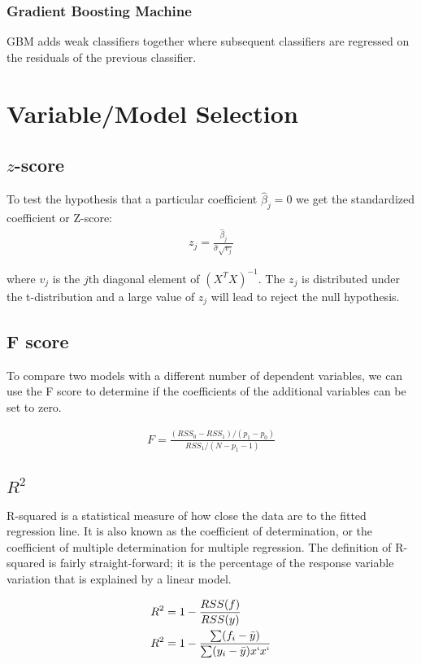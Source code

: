 \documentclass[12pt]{article}
\begin{document}
\subsubsection{Gradient Boosting Machine}
GBM adds weak classifiers together where subsequent classifiers are regressed on the residuals of the previous classifier.

\section{Variable/Model Selection}

\subsection{$z$-score}
To test the hypothesis that a particular coefficient $\hat{\beta}_j = 0$ we get the standardized coefficient or Z-score:
\begin{align*}
z_j = \frac{\hat{\beta}_j}{\hat{\sigma}\sqrt{v_j}}
\end{align*}

where $v_j$ is the $j$th diagonal element of $(X^TX)^{-1}$. The $z_j$ is distributed under the t-distribution and a large value of $z_j$ will lead to reject the null hypothesis.

\subsection{F score}
To compare two models with a different number of dependent variables, we can use the F score to determine if the coefficients of the additional variables can be set to zero.

\begin{align*}
F = \frac{(RSS_0 - RSS_1)/(p_1 - p_0)}{RSS_1/(N-p_1 - 1)}
\end{align*}

\subsection{$R^2$}
R-squared is a statistical measure of how close the data are to the fitted regression line. It is also known as the coefficient of determination, or the coefficient of multiple determination for multiple regression. The definition of R-squared is fairly straight-forward; it is the percentage of the response variable variation that is explained by a linear model.

\begin{align*}
R^2 &= 1 - \frac{RSS(f)}{RSS(y)} \\
R^2 &= 1 - \frac{\sum (f_i - \bar{y})}{\sum (y_i - \bar{y})x`x`}
\end{align*}
\end{document}
